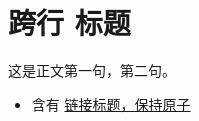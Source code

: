 \section{跨行
标题}
这是正文第一句，第二句。

\begin{itemize}
\item 含有 \href{https://example.com/docs}{链接标题，保持原子}
\end{itemize}
